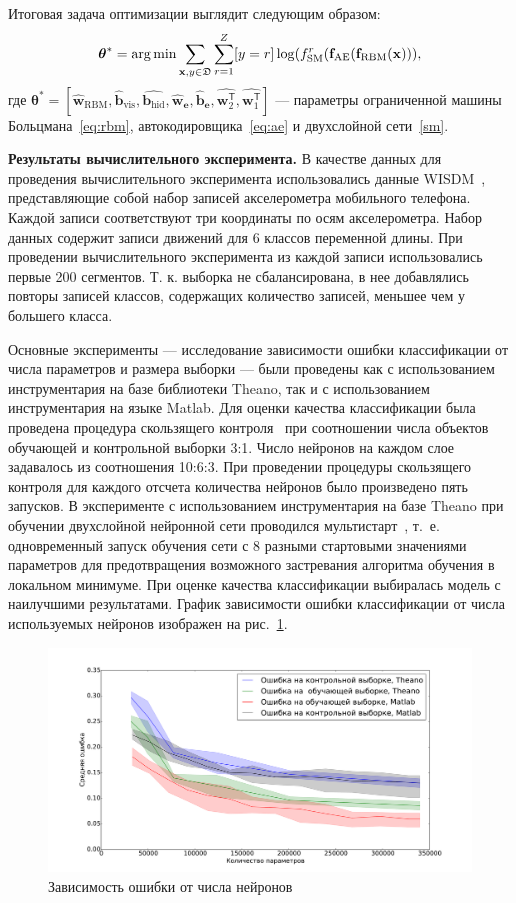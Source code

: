 Итоговая задача оптимизации выглядит следующим образом:
\[
 \boldsymbol{\theta}^{*} = \operatorname*{arg\,min}\sum_{\mathbf{x},y \in \mathfrak{D}}\sum_{r = 1}^Z[y = r]\log(f^r_\text{SM}(\mathbf{f}_\text{AE}(\mathbf{f}_\text{RBM}(\mathbf{x}))),
\]
где $\boldsymbol{\theta}^{*} = [\hat{\mathbf{w}}_\text{RBM},\hat{\mathbf{b}}_\text{vis},\hat{\mathbf{b}_\text{hid}}, \hat{\mathbf{w}}_\textbf{e}, \hat{\mathbf{b}}_\textbf{e}, \hat{\mathbf{w}^\mathsf{T}_2}, \hat{\mathbf{w}^\mathsf{T}_1}]$ --- параметры ограниченной машины Больцмана~\eqref{eq:rbm}, автокодировщика~\eqref{eq:ae} и двухслойной сети~\eqref{sm}.


\textbf{Результаты вычислительного эксперимента. }
В качестве данных для проведения вычислительного эксперимента использовались данные WISDM~\cite{wisdm}, представляющие собой набор записей акселерометра мобильного телефона. Каждой записи соответствуют три координаты по осям акселерометра. Набор данных содержит записи движений для 6 классов переменной длины.
При проведении вычислительного эксперимента из каждой записи использовались первые 200 сегментов. Т. к. выборка не сбалансирована, в нее добавлялись повторы записей классов, содержащих количество записей, меньшее чем у большего класса.

Основные эксперименты --- исследование зависимости ошибки классификации от числа параметров и размера выборки --- были проведены как с использованием инструментария на базе библиотеки Theano, так и с использованием инструментария на языке Matlab.
Для оценки качества классификации была проведена процедура скользящего контроля~\cite{cv_ms} при соотношении числа объектов обучающей и контрольной выборки 3:1. Число нейронов на каждом слое задавалось из соотношения 10:6:3. При проведении процедуры скользящего контроля для каждого отсчета количества нейронов было произведено пять запусков. В эксперименте с использованием инструментария на базе Theano при обучении двухслойной нейронной сети проводился мультистарт~\cite{multi}, т.~е. одновременный запуск обучения сети с 8 разными стартовыми значениями параметров для предотвращения возможного застревания алгоритма обучения в локальном минимуме. При оценке качества классификации выбиралась модель с наилучшими результатами. График зависимости ошибки классификации от числа используемых нейронов изображен на рис.~\ref{fig:neurons}.


\begin{figure}[tb!]
 \centering
  \includegraphics[width=1.0\textwidth]{plots/popova/neurons.pdf}
 \caption{Зависимость ошибки от числа нейронов}
 \label{fig:neurons}
\end{figure}


